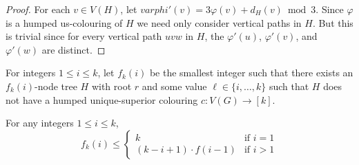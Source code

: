 \documentclass[kpfonts]{patmorin}
\begin{document}
\begin{proof}
   For each $v\in V(H)$, let $varphi'(v)=3\varphi(v)+d_H(v)\bmod 3$.  Since $\varphi$ is a humped us-colouring of $H$ we need only consider vertical paths in $H$.  But this is trivial since for every vertical path $uvw$ in $H$, the $\varphi'(u)$, $\varphi'(v)$, and $\varphi'(w)$ are distinct.
\end{proof}

For integers $1\le i\le k$, let $f_k(i)$ be the smallest integer such that there exists an $f_k(i)$-node tree $H$ with root $r$ and some value $\ell \in\{i,\ldots,k\}$ such that $H$ does not have a humped unique-superior colouring $c:V(G)\to [k]$.

\begin{lem}\label{recursion}
    For any integers $1\le  i\le k$,
    \[
        f_k(i) \le \begin{cases}
                    k & \text{if $i=1$} \\
                    (k-i+1)\cdot f(i-1) & \text{if $i>1$}
                 \end{cases}
    \]
\end{lem}
\end{document}

